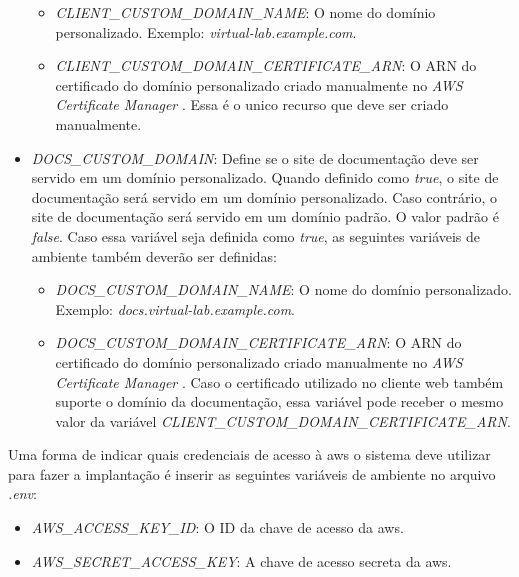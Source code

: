 \begin{itemize}
    \begin{itemize}

        \item \textit{CLIENT\_CUSTOM\_DOMAIN\_NAME}: O nome do domínio personalizado. Exemplo: \textit{virtual-lab.example.com}.

        \item \textit{CLIENT\_CUSTOM\_DOMAIN\_CERTIFICATE\_ARN}: O ARN do certificado do domínio personalizado criado manualmente no \textit{AWS Certificate Manager} \citep{awscertificatemanagerdocs}. Essa é o unico recurso que deve ser criado manualmente.

    \end{itemize}

    \item \textit{DOCS\_CUSTOM\_DOMAIN}: Define se o site de documentação deve ser servido em um domínio personalizado. Quando definido como \textit{true}, o site de documentação será servido em um domínio personalizado. Caso contrário, o site de documentação será servido em um domínio padrão. O valor padrão é \textit{false}. Caso essa variável seja definida como \textit{true}, as seguintes variáveis de ambiente também deverão ser definidas:

    \begin{itemize}

        \item \textit{DOCS\_CUSTOM\_DOMAIN\_NAME}: O nome do domínio personalizado. Exemplo: \textit{docs.virtual-lab.example.com}.

        \item \textit{DOCS\_CUSTOM\_DOMAIN\_CERTIFICATE\_ARN}: O ARN do certificado do domínio personalizado criado manualmente no \textit{AWS Certificate Manager} \citep{awscertificatemanagerdocs}. Caso o certificado utilizado no cliente web também suporte o domínio da documentação, essa variável pode receber o mesmo valor da variável \textit{CLIENT\_CUSTOM\_DOMAIN\_CERTIFICATE\_ARN}.

    \end{itemize}

\end{itemize}

Uma forma de indicar quais credenciais de acesso à \gls{aws} o sistema deve utilizar para fazer a implantação é inserir as seguintes variáveis de ambiente no arquivo \textit{.env}:

\begin{itemize}
    \item \textit{AWS\_ACCESS\_KEY\_ID}: O ID da chave de acesso da \gls{aws}.
    \item \textit{AWS\_SECRET\_ACCESS\_KEY}: A chave de acesso secreta da \gls{aws}.
\end{itemize}

